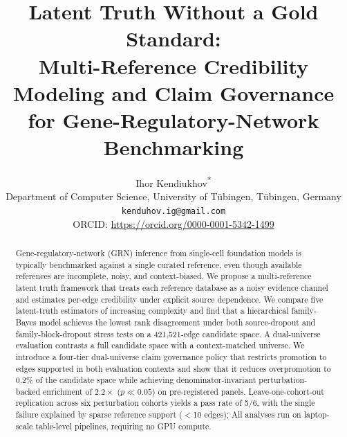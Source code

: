 \documentclass[11pt,a4paper]{article}
\title{%
  Latent Truth Without a Gold Standard:\\
  Multi-Reference Credibility Modeling and Claim Governance\\
  for Gene-Regulatory-Network Benchmarking%
}
\author{%
  Ihor Kendiukhov\textsuperscript{*}\\[4pt]
  {\normalsize Department of Computer Science, University of T\"ubingen, T\"ubingen, Germany}\\[2pt]
  {\normalsize \texttt{kenduhov.ig@gmail.com}}\\[2pt]
  {\small ORCID: \url{https://orcid.org/0000-0001-5342-1499}}
}
\date{}
\begin{document}
\linenumbers
\maketitle

\renewcommand{\thefootnote}{\fnsymbol{footnote}}
\renewcommand{\thefootnote}{\arabic{footnote}}

\begin{abstract}
Gene-regulatory-network (GRN) inference from single-cell foundation models is typically benchmarked against a single curated reference, even though available references are incomplete, noisy, and context-biased.
We propose a multi-reference latent truth framework that treats each reference database as a noisy evidence channel and estimates per-edge credibility under explicit source dependence.
We compare five latent-truth estimators of increasing complexity and find that a hierarchical family-Bayes model achieves the lowest rank disagreement under both source-dropout and family-block-dropout stress tests on a 421,521-edge candidate space.
A dual-universe evaluation contrasts a full candidate space with a context-matched universe.
We introduce a four-tier dual-universe claim governance policy that restricts promotion to edges supported in both evaluation contexts and show that it reduces overpromotion to 0.2\% of the candidate space while achieving denominator-invariant perturbation-backed enrichment of $2.2\times$ ($p \ll 0.05$) on pre-registered panels.
Leave-one-cohort-out replication across six perturbation cohorts yields a pass rate of 5/6, with the single failure explained by sparse reference support ($<$10 edges); 
All analyses run on laptop-scale table-level pipelines, requiring no GPU compute.
\end{abstract}
\end{document}

